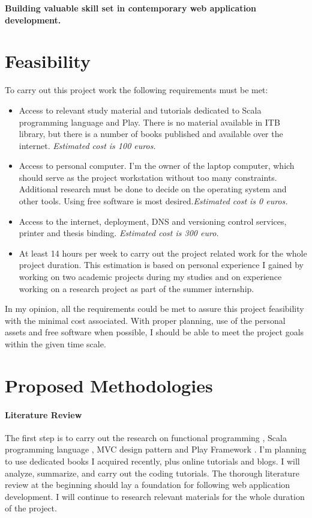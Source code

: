 \documentclass[12pt,twoside,a4paper]{report}
\begin{document}
\textbullet \textbf{ Building valuable skill set in contemporary web application development.}

\section{Feasibility}

To carry out this project work the following requirements must be met:

\begin{itemize}
\item Access to relevant study material and tutorials dedicated to Scala programming language and Play. There is no material available in ITB library, but there is a number of books published and available over the internet. \textit{Estimated cost is 100 euros.}
\item Access to personal computer. I'm the owner of the laptop computer, which should serve as the project workstation without too many constraints. Additional research must be done to decide on the operating system and other tools. Using free software is most desired.\textit{Estimated cost is 0 euros.}
\item Access to the internet, deployment, DNS and versioning control services, printer and thesis binding.\textit{ Estimated cost is 300 euro.}
\item At least 14 hours per week to carry out the project related work for the whole project duration. This estimation is based on personal experience I gained by working on two academic projects during my studies and on experience working on a research project as part of the summer internship.
\end{itemize}

In my opinion, all the requirements could be met to assure this project feasibility with the minimal cost associated. With proper planning, use of the personal assets and free software when possible, I should be able to meet the project goals within the given time scale.

\section{Proposed Methodologies}

\paragraph{Literature Review\\}
The first step is to carry out the research on functional programming \cite{9}, Scala programming language \cite{10}, MVC design pattern and Play Framework \cite{11}. I'm planning to use dedicated books I acquired recently, plus online tutorials and blogs. I will analyze, summarize, and carry out the coding tutorials. The thorough literature review at the beginning should lay a foundation for following web application development. I will continue to research relevant materials for the whole duration of the project.
\end{document}

